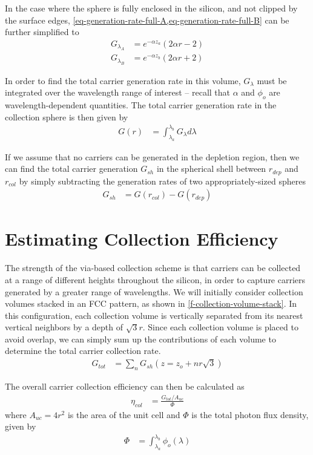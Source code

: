\documentclass[journal,twoside]{IEEEtran}
\begin{document}
In the case where the sphere is fully enclosed in the silicon, and not clipped by the surface edges, \cref{eq-generation-rate-full-A,eq-generation-rate-full-B}
can be further simplified to
\begin{align}
	G_{\lambda_A} &= e^{-\alpha z_a} \left( 2\alpha r - 2\right)	\label{eq-generation-rate-simplified-A}	\\
	G_{\lambda_B} &= e^{-\alpha z_b} \left( 2\alpha r + 2\right)	\label{eq-generation-rate-simplified-B}
\end{align}

In order to find the total carrier generation rate in this volume, $G_\lambda$ must be integrated over the wavelength range of interest --
recall that $\alpha$ and $\phi_o$ are wavelength-dependent quantities. The total carrier generation rate in the collection sphere is
then given by
\begin{align}
	G(r) &= \int_{\lambda_a}^{\lambda_b} G_\lambda d\lambda
\end{align}

If we assume that no carriers can be generated in the depletion region, then we can find the total carrier generation $G_{sh}$ in the spherical
shell between $r_{dep}$ and $r_{col}$ by simply subtracting the generation rates of two appropriately-sized spheres
\begin{align}
	G_{sh} &= G(r_{col}) - G(r_{dep})	\label{eq-generation-rate-shell}
\end{align}

\section{Estimating Collection Efficiency}
The strength of the via-based collection scheme is that carriers can be collected at a range of different heights
throughout the silicon, in order to capture carriers generated by a greater range of wavelengths. We will initially consider collection
volumes stacked in an FCC pattern, as shown in \cref{f-collection-volume-stack}. In this configuration, each collection volume
is vertically separated from its nearest vertical neighbors by a depth of $\sqrt{3}r$. Since each collection volume is placed
to avoid overlap, we can simply sum up the contributions of each volume to determine the total carrier collection rate.
\begin{align}
	G_{tot} &= \sum_n G_{sh}(z=z_o + nr\sqrt{3})	\label{eq-generation-rate-unit-cell}
\end{align}

The overall carrier collection efficiency can then be calculated as
\begin{align}
	\eta_{col} &= \frac{G_{tot} / A_{uc} }{\Phi}	\label{eq-collection-efficiency}
\end{align}
where $A_{uc} = 4r^2$ is the area of the unit cell and $\Phi$ is the total photon flux density, given by
\begin{align}
	\Phi &= \int_{\lambda_a}^{\lambda_b} \phi_o(\lambda)
\end{align}
\end{document}
